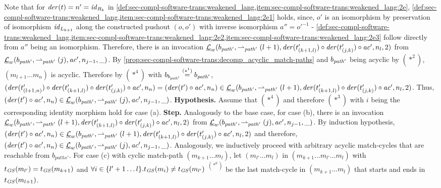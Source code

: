 \begin{enumerate}
  Note that for $\mathit{der}(t)=n'=\mathit{id}_{R_k}$ in \cref{def:sec-compl-software-trans:weakened_lang,item:sec-compl-software-trans:weakened_lang:2e}, \cref{def:sec-compl-software-trans:weakened_lang,item:sec-compl-software-trans:weakened_lang:2e1} holds, since, $o'$ is an isomorphism by preservation of isomorphism $\mathit{id}_{L_{k+1}}$ along the constructed pushout $(o,o')$ with inverse isomorphism $a''=o'^{-1}$ - \cref{def:sec-compl-software-trans:weakened_lang,item:sec-compl-software-trans:weakened_lang:2e2,item:sec-compl-software-trans:weakened_lang:2e3} follow directly from $a''$ being an isomorphism.
  Therefore, there is an invocation $\underline{\mathcal{L}}_w(b_{\mathit{path}'},\rightharpoonup_{\mathit{path}'}(l+1),\mathit{der}(t'_{(k+1,l)}) \circ \mathit{der}(t'_{(j,k)}) \circ \mathit{ac}',n_l,2)$ from $\underline{\mathcal{L}}_w(b_{\mathit{path}'},\rightharpoonup_{\mathit{path}'}(j),\mathit{ac}',n_{j-1},\_)$.
  By \cref{prop:sec-compl-software-trans:decomp_acyclic_match-paths} and $b_{\mathit{path}'}$ being acyclic by $(*^2)$, $(m_{l+1}\ldots m_n)$ is acyclic.
  Therefore by $(*^4)$ with $b_{b_{\mathit{path}'}} \stackrel{(*^1)}{=} b_{\mathit{path}'}$, $(\mathit{der}(t'_{(l+1,n)}) \circ \mathit{der}(t'_{(k+1,l)}) \circ \mathit{der}(t'_{(j,k)}) \circ \mathit{ac}',n_n)=(\mathit{der}(t') \circ \mathit{ac}',n_n) \in \underline{\mathcal{L}}_w(b_{\mathit{path}'},\rightharpoonup_{\mathit{path}'}(l+1),\mathit{der}(t'_{(k+1,l)}) \circ \mathit{der}(t'_{(j,k)}) \circ \mathit{ac}',n_l,2)$.
  Thus, $(\mathit{der}(t') \circ \mathit{ac}',n_n) \in \underline{\mathcal{L}}_w(b_{\mathit{path}'},\rightharpoonup_{\mathit{path}'}(j),\mathit{ac}',n_{j-1},\_)$.
  \textbf{Hypothesis.}
  Assume that $(*^4)$ and therefore $(*^3)$ with $i$ being the corresponding identity morphism hold for case (a).
  \textbf{Step.}
  Analogously to the base case, for case (b), there is an invocation $\underline{\mathcal{L}}_w(b_{\mathit{path}'},\rightharpoonup_{\mathit{path}'}(l+1),\mathit{der}(t'_{(k+1,l)}) \circ \mathit{der}(t'_{(j,k)}) \circ \mathit{ac}',n_l,2)$ from $\underline{\mathcal{L}}_w(b_{\mathit{path}'},\rightharpoonup_{\mathit{path}'}(j),\mathit{ac}',n_{j-1},\_)$.
  By induction hypothesis, $(\mathit{der}(t') \circ \mathit{ac}',n_n) \in \underline{\mathcal{L}}_w(b_{\mathit{path}'},\rightharpoonup_{\mathit{path}'}(l+1),\mathit{der}(t'_{(k+1,l)}) \circ \mathit{der}(t'_{(j,k)}) \circ \mathit{ac}',n_l,2)$ and therefore, $(\mathit{der}(t') \circ \mathit{ac}',n_n) \in \underline{\mathcal{L}}_w(b_{\mathit{path}'},\rightharpoonup_{\mathit{path}'}(j),\mathit{ac}',n_{j-1},\_)$.
  Analogously, we inductively proceed with arbitrary acyclic match-cycles that are reachable from $b_{paths'}$.
  For case (c) with cyclic match-path $(m_{k+1}\ldots m_l)$, let $(m_{l'}\ldots m_l)$ in $(m_{k+1}\ldots m_{l'}\ldots m_l)$ with $t_\mathit{GS}(m_{l'})=t_\mathit{GS}(m_{k+1})$ and $\forall i \in \{l'+1\ldots l\}.t_\mathit{GS}(m_i) \neq t_\mathit{GS}(m_{l'})$ $^{(*^6)}$ be the last match-cycle in $(m_{k+1}\ldots m_l)$ that starts and ends in $t_\mathit{GS}(m_{l+1})$.

\end{enumerate}

